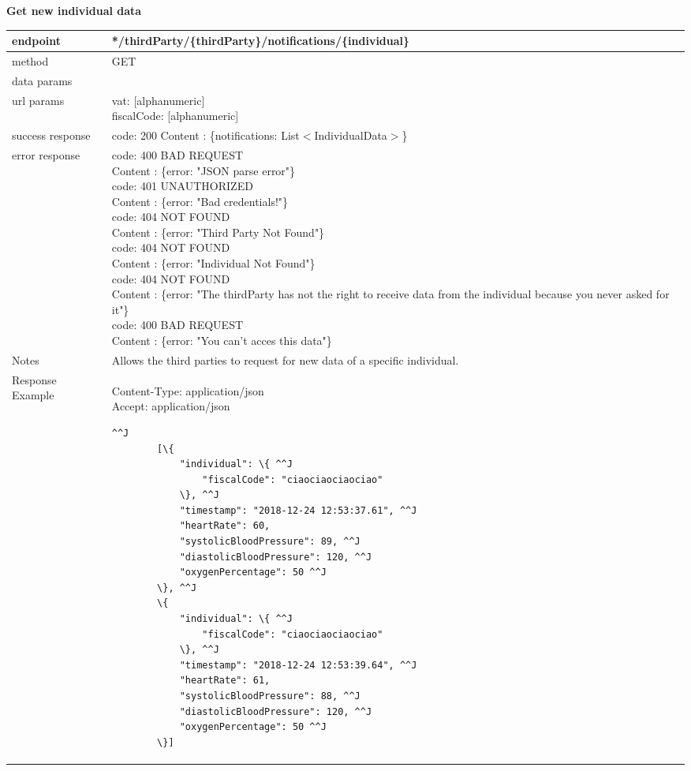 	\textbf{Get new individual data} \\

	\begin{tabularx}{\linewidth}{| l| l }
		\hline
		endpoint & */thirdParty/\{thirdParty\}/notifications/\{individual\} \\
		\hline
		method & GET \\
		\hline
		data params & \\
		\hline
		url params &
		\parbox{0.7\textwidth}{
			\bigskip
			vat: [alphanumeric]\\
			fiscalCode: [alphanumeric]
			\bigskip
		} \\
		\hline
		success response &
		\parbox{0.7\textwidth}{
			\bigskip
			code: 200\\
			Content : \{notifications: List$<$IndividualData$>$\}
			\bigskip
		} \\
		\hline
		error response &
		\parbox{0.7\textwidth}{
			\bigskip
			code: 400 BAD REQUEST \\
			Content : \{error: "JSON parse error"\}\\
			code: 401 UNAUTHORIZED \\
			Content : \{error: "Bad credentials!"\}\\
			code: 404 NOT FOUND \\
			Content : \{error: "Third Party Not Found"\}\\
			code: 404 NOT FOUND \\
			Content : \{error: "Individual Not Found"\}\\
			code: 404 NOT FOUND \\
			Content : \{error: "The thirdParty has not the right to receive data from the individual because you never asked for it"\}\\
			code: 400 BAD REQUEST \\
			Content : \{error: "You can't acces this data"\}\\
			\bigskip
		} \\
		\hline
		Notes & 
		\parbox{0.7\textwidth}{
			\bigskip Allows the third parties to request for new data of a specific individual.
		\bigskip}  \\
		\hline
		Response Example & 
		\parbox{0.8\textwidth}{
		\bigskip
		Content-Type: application/json \\
		Accept: application/json \\
		\bigskip
		\begin{lstlisting}^^J
		[\{
			"individual": \{ ^^J
				"fiscalCode": "ciaociaociaociao"
			\}, ^^J
			"timestamp": "2018-12-24 12:53:37.61", ^^J
			"heartRate": 60,
			"systolicBloodPressure": 89, ^^J
			"diastolicBloodPressure": 120, ^^J
			"oxygenPercentage": 50 ^^J
		\}, ^^J
		\{
			"individual": \{ ^^J
				"fiscalCode": "ciaociaociaociao"
			\}, ^^J
			"timestamp": "2018-12-24 12:53:39.64", ^^J
			"heartRate": 61,
			"systolicBloodPressure": 88, ^^J
			"diastolicBloodPressure": 120, ^^J
			"oxygenPercentage": 50 ^^J
		\}]
	\end{lstlisting}
	} \\
	\hline
	\end{tabularx}
	

